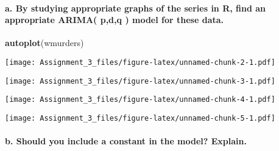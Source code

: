 \documentclass[]{article}
\newenvironment{Shaded}{\begin{snugshade}}{\end{snugshade}}
\newcommand{\KeywordTok}[1]{\textcolor[rgb]{0.13,0.29,0.53}{\textbf{#1}}}
\newcommand{\StringTok}[1]{\textcolor[rgb]{0.31,0.60,0.02}{#1}}
\newcommand{\OperatorTok}[1]{\textcolor[rgb]{0.81,0.36,0.00}{\textbf{#1}}}
\newcommand{\NormalTok}[1]{#1}
\let\oldparagraph\paragraph
\renewcommand{\paragraph}[1]{\oldparagraph{#1}\mbox{}}
\begin{document}
\paragraph{a. By studying appropriate graphs of the series in R, find an
appropriate ARIMA( p,d,q ) model for these
data.}\label{a.-by-studying-appropriate-graphs-of-the-series-in-r-find-an-appropriate-arima-pdq-model-for-these-data.}

\begin{Shaded}
\begin{Highlighting}[]
\KeywordTok{autoplot}\NormalTok{(wmurders)}
\end{Highlighting}
\end{Shaded}

\texttt{[image: Assignment\_3\_files/figure-latex/unnamed-chunk-2-1.pdf]}

\begin{Shaded}
\end{Shaded}

\texttt{[image: Assignment\_3\_files/figure-latex/unnamed-chunk-3-1.pdf]}

\begin{Shaded}
\end{Shaded}

\texttt{[image: Assignment\_3\_files/figure-latex/unnamed-chunk-4-1.pdf]}

\begin{Shaded}
\end{Shaded}

\texttt{[image: Assignment\_3\_files/figure-latex/unnamed-chunk-5-1.pdf]}

\paragraph{b. Should you include a constant in the model?
Explain.}\label{b.-should-you-include-a-constant-in-the-model-explain.}
\end{document}
